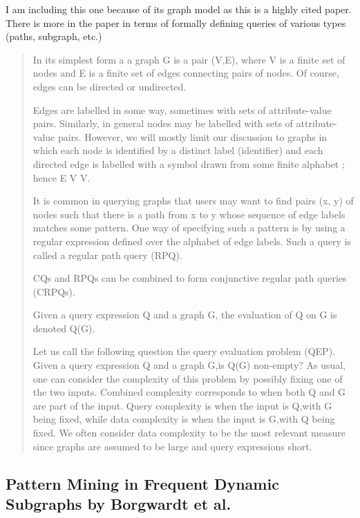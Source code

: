 \begin{itemize}
I am including this one because of its graph model as this is a highly cited paper. There is more in the paper in terms of formally defining queries of various types (paths, subgraph, etc.)

\begin{quote}

In its simplest form a a graph G is a pair (V,E), where V is a finite set of nodes and E is a finite set of edges connecting pairs of nodes. Of course, edges can be directed or undirected. 

Edges are labelled in some way, sometimes with sets of attribute-value pairs. Similarly, in general nodes may be labelled with sets of attribute-value pairs. However, we will mostly limit our discussion to graphs in which each node is identified by a distinct label (identifier) and each directed edge is labelled with a symbol drawn from some finite alphabet \Sigma; hence E \subseteq V \times \Sigma \times V.

It is common in querying graphs that users may want to find pairs (x, y) of nodes such that there is a path from x to y whose sequence of edge labels matches some pattern. One way of specifying such a pattern is by using a regular expression defined over the alphabet of edge labels. Such a query is called a regular path query (RPQ).

CQs and RPQs can be combined to form conjunctive regular path queries (CRPQs).

Given a query expression Q and a graph G, the evaluation of Q on G is denoted Q(G).

Let us call the following question the query evaluation problem (QEP). Given a query expression Q and a graph G,is Q(G) non-empty? As usual, one can consider the complexity of this problem by possibly fixing one of the two inputs. Combined complexity corresponds to when both Q and G are part of the input. Query complexity is when the input is Q,with G being fixed, while data complexity is when the input is G,with Q being fixed. We often consider data complexity to be the most relevant measure since graphs are assumed to be large and query expressions short.

\end{quote}

\subsection{Pattern Mining in Frequent Dynamic Subgraphs by Borgwardt et al.}


\end{itemize}
